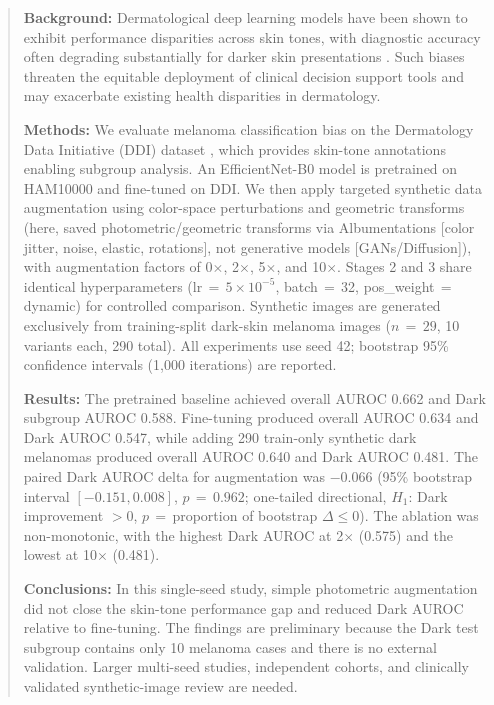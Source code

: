 \begin{abstract}
\textbf{Background:} Dermatological deep learning models have been shown to exhibit performance disparities across skin tones, with diagnostic accuracy often degrading substantially for darker skin presentations \cite{Daneshjou2022}. Such biases threaten the equitable deployment of clinical decision support tools and may exacerbate existing health disparities in dermatology.

\textbf{Methods:} We evaluate melanoma classification bias on the Dermatology Data Initiative (DDI) dataset \cite{DDI2021}, which provides skin-tone annotations \cite{Fitzpatrick1988} enabling subgroup analysis. An EfficientNet-B0 model is pretrained on HAM10000 and fine-tuned on DDI. We then apply targeted synthetic data augmentation using color-space perturbations and geometric transforms (here, saved photometric/geometric transforms via Albumentations [color jitter, noise, elastic, rotations], not generative models [GANs/Diffusion]), with augmentation factors of 0$\times$, 2$\times$, 5$\times$, and 10$\times$. Stages 2 and 3 share identical hyperparameters (lr\,$=$\,$5{\times}10^{-5}$, batch\,$=$\,32, pos\_weight\,$=$\,dynamic) for controlled comparison. Synthetic images are generated exclusively from training-split dark-skin melanoma images ($n\,{=}\,29$, 10 variants each, 290 total). All experiments use seed 42; bootstrap 95\% confidence intervals (1{,}000 iterations) are reported.

\textbf{Results:} The pretrained baseline achieved overall AUROC 0.662 and Dark subgroup AUROC 0.588. Fine-tuning produced overall AUROC 0.634 and Dark AUROC 0.547, while adding 290 train-only synthetic dark melanomas produced overall AUROC 0.640 and Dark AUROC 0.481. The paired Dark AUROC delta for augmentation was $-0.066$ (95\% bootstrap interval $[-0.151,0.008]$, $p\,{=}\,0.962$; one-tailed directional, $H_1$: Dark improvement $>0$, $p$\,$=$\,proportion of bootstrap $\Delta \leq 0$). The ablation was non-monotonic, with the highest Dark AUROC at 2$\times$ (0.575) and the lowest at 10$\times$ (0.481).

\textbf{Conclusions:} In this single-seed study, simple photometric augmentation did not close the skin-tone performance gap and reduced Dark AUROC relative to fine-tuning. The findings are preliminary because the Dark test subgroup contains only 10 melanoma cases and there is no external validation. Larger multi-seed studies, independent cohorts, and clinically validated synthetic-image review are needed.
\end{abstract}
